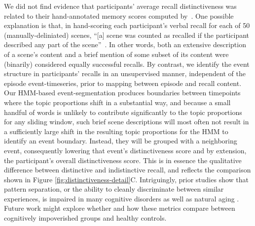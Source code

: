 We did not find evidence that participants' average recall distinctiveness was related to their hand-annotated memory scores computed by~\cite{ChenEtal17}.  One possible explanation is that, in hand-scoring each participant's verbal recall for each of 50 (manually-deliniated) scenes, ``[a] scene was counted as recalled if the participant described any part of the scene''~\citep{ChenEtal17}.  In other words, both an extensive description of a scene's content and a brief mention of some subset of its content were (binarily) considered equally successful recalls.  By contrast, we identify the event structure in participants' recalls in an unsupervised manner, independent of the episode event-timeseries, prior to mapping between episode and recall content.  Our HMM-based event-segmentation produces boundaries between timepoints where the topic proportions shift in a substantial way, and because a small handful of words is unlikely to contribute significantly to the topic proportions for any sliding window, such brief scene descriptions will most often not result in a sufficiently large shift in the resulting topic proportions for the HMM to identify an event boundary.  Instead, they will be grouped with a neighboring event, consequently lowering that event's distinctiveness score and by extension, the participant's overall distinctiveness score.  This is in essence the qualitative difference between distinctive and indistinctive recall, and reflects the comparison shown in Figure \ref{fig:distinctiveness-detail}C.  Intriguingly, prior studies show that pattern separation, or the ability to cleanly discriminate between similar experiences, is impaired in many cognitive disorders as well as natural aging \citep{StarEtal10, YassEtal11c, YassStar11b}.  Future work might explore whether and how these metrics compare between cognitively impoverished groups and healthy controls.

